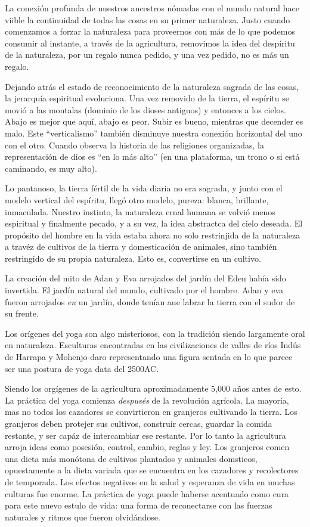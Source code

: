 La conexión profunda de nuestros ancestros nómadas con el mundo natural hace viible la continuidad de todas las cosas en su primer naturaleza. Justo cuando comenzamos a forzar la naturaleza para proveernos con más de lo que podemos consumir al instante, a trav\'es de la agricultura, removimos la idea del despíritu de la naturaleza, por un regalo nunca pedido, y una vez pedido, no es más un regalo.

Dejando atrás el estado de reconocimiento de la naturaleza sagrada de las cosas, la jerarquía espiritual evoluciona. Una vez removido de la tierra, el espíritu se movió a las montalas (dominio de los dioses antiguos) y entonces a los cielos. Abajo es mejor que aquí, abajo es peor. Subir es bueno, mientras que decender es malo. Este ``verticalismo'' tambi\'en disminuye nuestra conexión horizontal del uno con el otro. Cuando observa la historia de las religiones organizadas, la representación de dios es ``en lo más alto'' (en una plataforma, un trono o si está caminando, es muy alto).

Lo pantanoso, la tierra f\'ertil de la vida diaria no era sagrada, y junto con el modelo vertical del espíritu, llegó otro modelo, pureza: blanca, brillante, inmaculada. Nuestro instinto, la naturaleza crnal humana se volvió menos espiritual y finalmente pecado, y a su vez, la idea abstractca del cielo deseada. El propósito del hombre en la vida estaba ahora no solo restrinjida de la naturaleza a trav\'ez de cultivos de la tierra y domesticación de animales, sino tambi\'en restringido de su propia naturaleza. Esto es, convertirse en un cultivo.

La creación del mito de Adan y Eva arrojados del jardín del Eden había sido invertida. El jardín natural del mundo, cultivado por el hombre. Adan y eva fueron arrojados \textit{en} un jardín, donde tenían aue labrar la tierra con el sudor de su frente.

Los orígenes del yoga son algo misteriosos, con la tradición siendo largamente oral en naturaleza. Esculturas encontradas en las civilizaciones de valles de ríos Indús de Harrapa y Mohenjo-daro representando una figura sentada en lo que parece ser una postura de yoga data del 2500AC.

Siendo los orgígenes de la agricultura aproximadamente 5,000 años antes de esto. La práctica del yoga comienza \textit{despus\'es} de la revolución agrícola. La mayoría, mas no todos los cazadores se convirtieron en granjeros cultivando la tierra. Los granjeros deben protejer sus cultivos, construir cercas, guardar la comida restante, y ser capáz de intercambiar ese restante. Por lo tanto la agricultura arroja ideas como posesión, control, cambio, reglas y ley. Los granjeros comen una dieta más monótona de cultivos plantados y animales domsticos, opuestamente a la dieta variada que se encuentra en los cazadores y recolectores de temporada. Los efectos negativos en la salud y esperanza de vida en muchas culturas fue enorme. La práctica de yoga puede haberse acentuado como cura para este nuevo estulo de vida: una forma de reconectarse con las fuerzas naturales y ritmos que fueron olvidándose.

